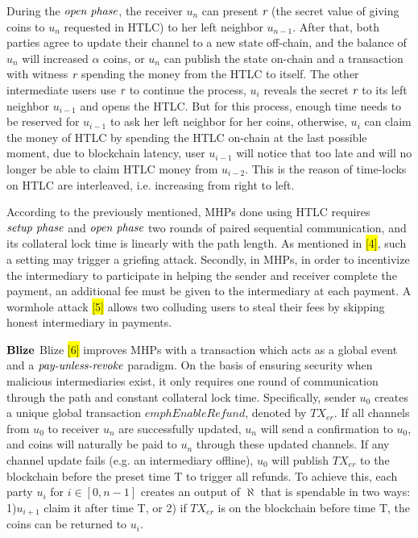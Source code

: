 \documentclass[conference]{IEEEtran}
\begin{document}
During the $\emph{open phase}$, the receiver $u_n$ can present $\emph{r}$ 
(the secret value of giving coins to $u_n$ requested in HTLC) to her left neighbor $u_{n-1}$. After that, both parties agree to update their 
channel to a new state off-chain, and the balance of $u_n$ will increased $\alpha$ coins, or $u_n$ can publish the state on-chain and a transaction 
with witness $\emph{r}$ spending the money from the HTLC to itself. The other intermediate users use $\emph{r}$ to continue the process, 
 $u_i$ reveals the secret $\emph{r}$ to its left neighbor $u_{i-1}$ and opens the HTLC. But for this process, enough time needs to be 
 reserved for $u_{i-1}$ to ask her left neighbor for her coins, otherwise, $u_i$ can claim the money of HTLC by spending the HTLC on-chain 
 at the last possible moment, due to blockchain latency, user $u_{i-1}$ will notice that too late and will no longer be able to claim HTLC 
 money from $u_{i-2}$. This is the reason of time-locks on HTLC are interleaved, i.e. increasing from right to left.

 According to the previously mentioned, MHPs done using HTLC requires $\emph{setup phase}$ and $\emph{open phase}$ two rounds of paired 
 sequential communication, and its collateral lock time is linearly with the path length. As mentioned in \colorbox{yellow}{[4]}, such a 
 setting may trigger a griefing attack. Secondly, in MHPs, in order to incentivize the intermediary to participate in helping the sender 
 and receiver complete the payment, an additional fee must be given to the intermediary at each payment. A wormhole attack \colorbox{yellow}{[5]} 
 allows two colluding users to steal their fees by skipping honest intermediary in payments.

 \noindent $\bf{Blize}$   Blize \colorbox{yellow}{[6]} improves MHPs with a transaction which acts as a global event and a $\emph{pay-unless-revoke}$ 
 paradigm. On the basis of ensuring security when malicious intermediaries exist, it only requires one round of communication through the 
 path and constant collateral lock time. Specifically, sender $u_0$ creates a unique global transaction $emph{Enable Refund}$, denoted 
 by $TX_{er}$. If all channels from $u_0$ to receiver $u_n$ are successfully updated, $u_n$ will send a confirmation to $u_0$, and coins 
 will naturally be paid to $u_n$ through these updated channels. If any channel update fails (e.g. an intermediary offline), $u_0$ will 
 publish $TX_{er}$ to the blockchain before the preset time T to trigger all refunds. To achieve this, each party $u_i$ for $i \in [0,n-1]$ 
 creates an output of $\aleph$ that is spendable in two ways: 1)$u_{i+1}$ claim it after time T, or 2) if $TX_{er}$ is on the blockchain 
 before time T, the coins can be returned to $u_i$.
\end{document}
